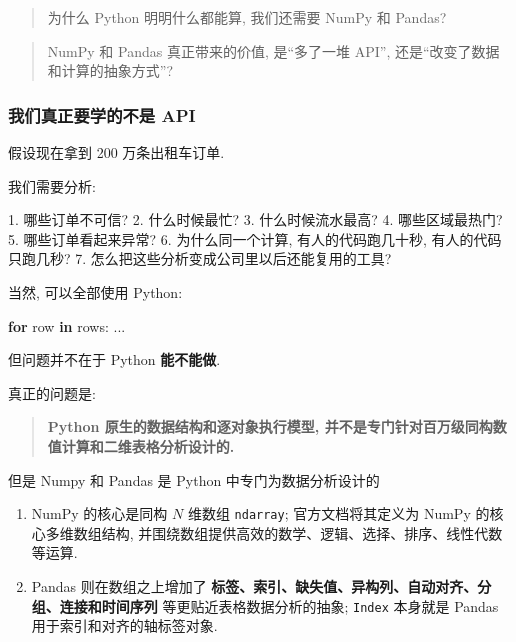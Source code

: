 \documentclass[11pt]{article}
\providecommand{\tightlist}{%
      \setlength{\itemsep}{0pt}\setlength{\parskip}{0pt}}
\newenvironment{Shaded}{}{}
\newcommand{\KeywordTok}[1]{\textcolor[rgb]{0.00,0.44,0.13}{\textbf{{#1}}}}
\newcommand{\NormalTok}[1]{{#1}}
\newcommand{\ControlFlowTok}[1]{\textcolor[rgb]{0.00,0.44,0.13}{\textbf{{#1}}}}
\begin{document}
\begin{quote}
为什么 Python 明明什么都能算, 我们还需要 NumPy 和 Pandas?
\end{quote}

\begin{quote}
NumPy 和 Pandas 真正带来的价值, 是``多了一堆 API'',
还是``改变了数据和计算的抽象方式''?
\end{quote}

    \subsubsection{我们真正要学的不是
API}\label{ux6211ux4eecux771fux6b63ux8981ux5b66ux7684ux4e0dux662f-api}

    假设现在拿到 200 万条出租车订单.

我们需要分析:

\begin{Shaded}
\begin{Highlighting}[]
\NormalTok{1. 哪些订单不可信? }
\NormalTok{2. 什么时候最忙? }
\NormalTok{3. 什么时候流水最高? }
\NormalTok{4. 哪些区域最热门? }
\NormalTok{5. 哪些订单看起来异常? }
\NormalTok{6. 为什么同一个计算, 有人的代码跑几十秒, 有人的代码只跑几秒? }
\NormalTok{7. 怎么把这些分析变成公司里以后还能复用的工具? }
\end{Highlighting}
\end{Shaded}

当然, 可以全部使用 Python:

\begin{Shaded}
\begin{Highlighting}[]
\ControlFlowTok{for}\NormalTok{ row }\KeywordTok{in}\NormalTok{ rows:}
\NormalTok{    ...}
\end{Highlighting}
\end{Shaded}

但问题并不在于 Python \textbf{能不能做}.

真正的问题是:

\begin{quote}
\textbf{Python 原生的数据结构和逐对象执行模型,
并不是专门针对百万级同构数值计算和二维表格分析设计的.}
\end{quote}

但是 Numpy 和 Pandas 是 Python 中专门为数据分析设计的

\begin{enumerate}
\def\labelenumi{\arabic{enumi}.}
\tightlist
\item
  NumPy 的核心是同构 \(N\) 维数组 \texttt{ndarray}; 官方文档将其定义为
  NumPy 的核心多维数组结构,
  并围绕数组提供高效的数学、逻辑、选择、排序、线性代数等运算.
\item
  Pandas 则在数组之上增加了
  \textbf{标签、索引、缺失值、异构列、自动对齐、分组、连接和时间序列}
  等更贴近表格数据分析的抽象; \texttt{Index} 本身就是 Pandas
  用于索引和对齐的轴标签对象.
\end{enumerate}
\end{document}
